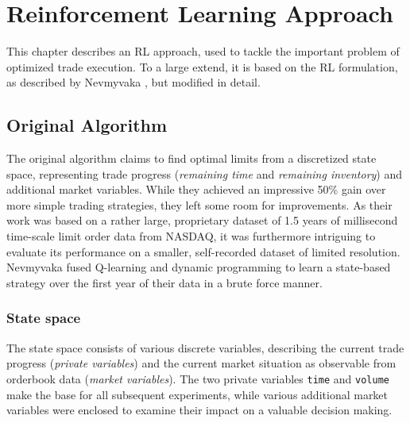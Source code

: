 \chapter{Reinforcement Learning Approach}
\label{chap:reinforcementlearning}
This chapter describes an \ac{RL} approach, used to tackle the important problem of optimized trade execution. To a large extend, it is based on the \ac{RL} formulation, as described by Nevmyvaka \etal \cite{Nevmyvaka:2006}, but modified in detail.\\

\section{Original Algorithm}
The original algorithm claims to find optimal limits from a discretized state space, representing trade progress (\ie \emph{remaining time} and \emph{remaining inventory}) and additional market variables. While they achieved an impressive 50\% gain over more simple trading strategies, they left some room for improvements. As their work was based on a rather large, proprietary dataset of 1.5 years of millisecond time-scale limit order data from NASDAQ, it was furthermore intriguing to evaluate its performance on a smaller, self-recorded dataset of limited resolution.\\

Nevmyvaka \etal \cite{Nevmyvaka:2006} fused Q-learning and dynamic programming to learn a state-based strategy over the first year of their data in a brute force manner.

\subsection{State space}
\label{chap:statespace}
The state space consists of various discrete variables, describing the current trade progress (\emph{private variables}) and the current market situation as observable from orderbook data (\emph{market variables}). The two private variables \lstinline!time! and \lstinline!volume! make the base for all subsequent experiments, while various additional market variables were enclosed to examine their impact on a valuable decision making.\\

